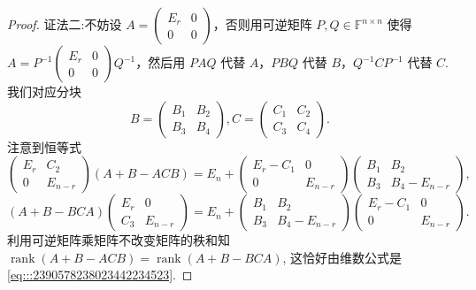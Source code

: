 \documentclass[../../main.tex]{subfiles}%
\begin{document}
\begin{proof}
{\color{blue}证法二:}不妨设 $A = \begin{pmatrix} E_r & 0 \\ 0 & 0 \end{pmatrix}$，否则用可逆矩阵 $P, Q \in \mathbb{F}^{n \times n}$ 使得 $A = P^{-1} \begin{pmatrix} E_r & 0 \\ 0 & 0 \end{pmatrix} Q^{-1}$，然后用 $PAQ$ 代替 $A$，$PBQ$ 代替 $B$，$Q^{-1}CP^{-1}$ 代替 $C$. 我们对应分块
\[
B = \begin{pmatrix} B_1 & B_2 \\ B_3 & B_4 \end{pmatrix}, C = \begin{pmatrix} C_1 & C_2 \\ C_3 & C_4 \end{pmatrix}.
\]
注意到恒等式
\[
\begin{pmatrix}
E_r & C_2 \\
0 & E_{n - r}
\end{pmatrix}(A + B - ACB) = E_n + \begin{pmatrix}
E_r - C_1 & 0 \\
0 & E_{n - r}
\end{pmatrix}\begin{pmatrix}
B_1 & B_2 \\
B_3 & B_4 - E_{n - r}
\end{pmatrix},
\]
\[
(A + B - BCA)\begin{pmatrix}
E_r & 0 \\
C_3 & E_{n - r}
\end{pmatrix} = E_n + \begin{pmatrix}
B_1 & B_2 \\
B_3 & B_4 - E_{n - r}
\end{pmatrix}\begin{pmatrix}
E_r - C_1 & 0 \\
0 & E_{n - r}
\end{pmatrix}.
\]
利用可逆矩阵乘矩阵不改变矩阵的秩和知 $\operatorname{rank}(A + B - ACB) = \operatorname{rank}(A + B - BCA)$, 这恰好由维数公式是\eqref{eq:::2390578238023442234523}. 

\end{proof}
\end{document}
